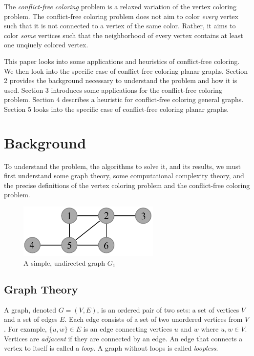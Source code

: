 \documentclass{sig-alternate}
\begin{document}
The \emph{conflict-free coloring} problem is a relaxed variation of the vertex coloring problem. The conflict-free coloring problem does not aim to color \emph{every} vertex such that it is not connected to a vertex of the same color. Rather, it aims to color \emph{some} vertices such that the neighborhood of every vertex contains at least one unqiuely colored vertex.

This paper looks into some applications and heuristics of conflict-free coloring. We then look into the specific case of conflict-free coloring planar graphs. Section 2 provides the background necessary to understand the problem and how it is used. Section 3 introduces some applications for the conflict-free coloring problem. Section 4 describes a heuristic for conflict-free coloring general graphs. Section 5 looks into the specific case of conflict-free coloring planar graphs.


\section{Background}
\label{sec:background}
To understand the problem, the algorithms to solve it, and its results, we must first understand some graph theory, some computational complexity theory, and the precise definitions of the vertex coloring problem and the conflict-free coloring problem.

\begin{figure}[h]
	\centering
	\includegraphics[width=7cm]{../figures/example.pdf}
	\caption{A simple, undirected graph $G_1$}\label{fig:graph}
\end{figure}

\subsection{Graph Theory}
\label{sec:graphtheory}

A graph, denoted $G=(V,E)$, is an ordered pair of two sets: a set of vertices $V$ and a set of edges $E$. Each edge consists of a set of two unordered vertices from $V$. For example, $\{u, w\} \in E$ is an edge connecting vertices $u$ and $w$ where $u,w \in V$. Vertices are \emph{adjacent} if they are connected by an edge. An edge that connects a vertex to itself is called a \emph{loop}. A graph without loops is called \emph{loopless}.
\end{document}
